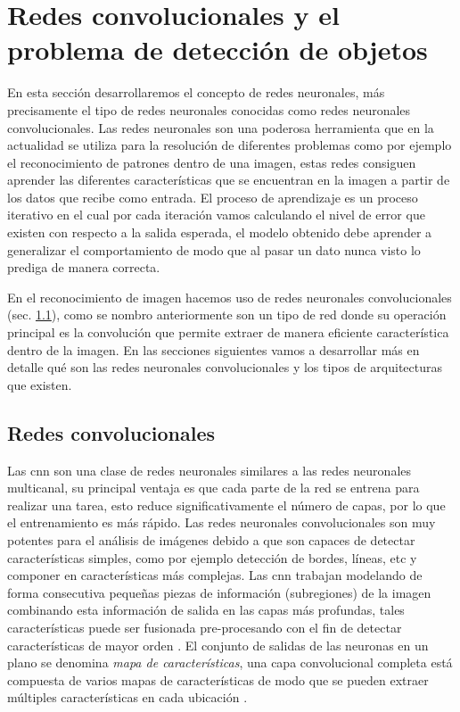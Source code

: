 \section{Redes convolucionales y el problema de detección de objetos}\label{sec:compueter-vision}

En esta sección desarrollaremos el concepto de redes neuronales, más precisamente el tipo de  redes neuronales conocidas como redes neuronales convolucionales. Las redes neuronales son una poderosa herramienta que en la actualidad se utiliza para la resolución de diferentes problemas como por ejemplo el reconocimiento de patrones dentro de una imagen, estas redes consiguen aprender las diferentes características que se encuentran en la imagen a partir de los datos que recibe como entrada. El proceso de aprendizaje es un proceso iterativo en el cual por cada iteración vamos calculando el nivel de error que existen con respecto a la salida esperada, el modelo obtenido debe aprender a generalizar el comportamiento de modo que al pasar un dato nunca visto lo prediga de manera correcta. 

En el reconocimiento de imagen  hacemos uso de redes neuronales convolucionales (sec. \ref{sub:cnn}), como se nombro anteriormente son un tipo de red donde su operación principal es la convolución que permite extraer de manera eficiente característica dentro de la imagen. En las secciones siguientes vamos a desarrollar más en detalle qué son las redes neuronales convolucionales y los tipos de arquitecturas que existen. 


\subsection{Redes convolucionales}\label{sub:cnn}

Las \ac{cnn} son una clase de redes neuronales  similares a las redes neuronales multicanal, su principal ventaja es que cada parte de la red se entrena para realizar una tarea, esto reduce significativamente el número de capas, por lo que el entrenamiento es más rápido. Las redes neuronales convolucionales son muy potentes para el análisis de imágenes debido a que son capaces de detectar características simples, como por ejemplo detección de bordes, líneas, etc y componer en características más complejas. Las \ac{cnn} trabajan modelando de forma consecutiva pequeñas piezas de información (subregiones) de la imagen combinando esta información de salida en las capas más profundas, tales características puede ser fusionada pre-procesando con el fin de detectar características de mayor orden \citep{murphy}. El conjunto de salidas de las neuronas en un plano se denomina \textit{mapa de características}, una capa convolucional completa está compuesta de varios mapas de características de modo que se pueden extraer múltiples características en cada ubicación \citep{cnns}.

